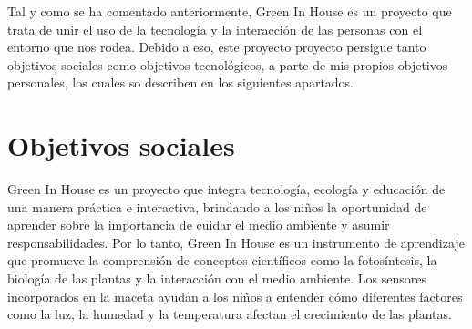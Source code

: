 Tal y como se ha comentado anteriormente, Green In House es un proyecto que trata de unir el uso de la tecnología y la interacción de las personas con el entorno que nos rodea. Debido a eso, este proyecto proyecto persigue tanto objetivos sociales como objetivos tecnológicos, a parte de mis propios objetivos personales, los cuales so describen en los siguientes apartados. 

\section{Objetivos sociales}\label{objetivos-sociales}
Green In House es un proyecto que integra tecnología, ecología y educación de una manera práctica e interactiva, brindando a los niños la oportunidad de aprender sobre la importancia de cuidar el medio ambiente y asumir responsabilidades. Por lo tanto, Green In House es un instrumento de aprendizaje que promueve la comprensión de conceptos científicos como la fotosíntesis, la biología de las plantas y la interacción con el medio ambiente. Los sensores incorporados en la maceta ayudan a los niños a entender cómo diferentes factores como la luz, la humedad y la temperatura afectan el crecimiento de las plantas.

